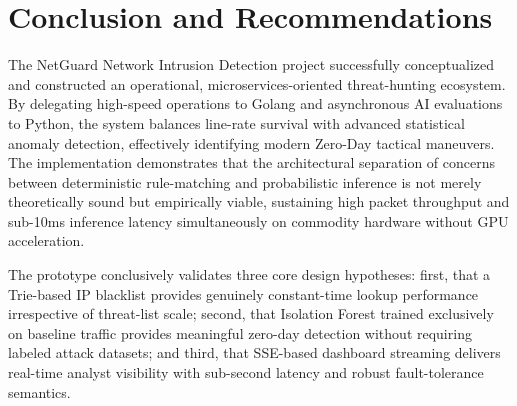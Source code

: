 \documentclass[conference]{IEEEtran}
\begin{document}
\section{Conclusion and Recommendations}
The NetGuard Network Intrusion Detection project successfully conceptualized and constructed an operational, microservices-oriented threat-hunting ecosystem. By delegating high-speed operations to Golang and asynchronous AI evaluations to Python, the system balances line-rate survival with advanced statistical anomaly detection, effectively identifying modern Zero-Day tactical maneuvers. The implementation demonstrates that the architectural separation of concerns between deterministic rule-matching and probabilistic inference is not merely theoretically sound but empirically viable, sustaining high packet throughput and sub-10ms inference latency simultaneously on commodity hardware without GPU acceleration.

The prototype conclusively validates three core design hypotheses: first, that a Trie-based IP blacklist provides genuinely constant-time lookup performance irrespective of threat-list scale; second, that Isolation Forest trained exclusively on baseline traffic provides meaningful zero-day detection without requiring labeled attack datasets; and third, that SSE-based dashboard streaming delivers real-time analyst visibility with sub-second latency and robust fault-tolerance semantics.
\end{document}
